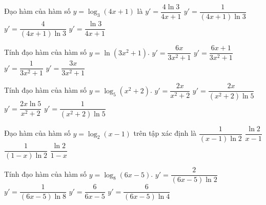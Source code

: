 \begin{ex}%
	Đạo hàm của hàm số $y=\log_3\left(4x+1\right)$ là
	\choice
	{$y'=\dfrac{4\ln 3}{4x+1}$}
	{$y'=\dfrac{1}{\left(4x+1\right)\ln 3}$}
	{\True $y'=\dfrac{4}{\left(4x+1\right)\ln 3}$}
	{$y'=\dfrac{\ln 3}{4x+1}$}
\end{ex}

\begin{ex}%
	Tính đạo hàm của hàm số $y=\ln\left(3x^2+1\right)$.
	\choice
	{\True $y'=\dfrac{6x}{3x^2+1}$}
	{$y'=\dfrac{6x+1}{3x^2+1}$}
	{$y'=\dfrac{1}{3x^2+1}$}
	{$y'=\dfrac{3x}{3x^2+1}$}
\end{ex}

\begin{ex}%
	Tính đạo hàm của hàm số $y=\log_5\left(x^2+2\right)$.
	\choice
	{$y'=\dfrac{2x}{x^2+2}$}
	{\True $y'=\dfrac{2x}{\left(x^2+2\right)\ln 5}$}
	{$y'=\dfrac{2x\ln 5}{x^2+2}$}
	{$y'=\dfrac{1}{\left(x^2+2\right)\ln 5}$}
\end{ex}

\begin{ex}%
	Đạo hàm của hàm số $y=\log_2\left(x-1\right)$ trên tập xác định là
	\choice
	{\True $\dfrac{1}{\left(x-1\right)\ln 2}$}
	{$\dfrac{\ln 2}{x-1}$}
	{$\dfrac{1}{\left(1-x\right)\ln 2}$}
	{$\dfrac{\ln 2}{1-x}$}
\end{ex}

\begin{ex}%
	Tính đạo hàm của hàm số $y=\log_8\left(6x-5\right)$.
	\choice
	{\True $y'=\dfrac{2}{\left(6x-5\right)\ln 2}$}
	{$y'=\dfrac{1}{\left(6x-5\right)\ln 8}$}
	{$y'=\dfrac{6}{6x-5}$}
	{$y'=\dfrac{6}{\left(6x-5\right)\ln 4}$}
\end{ex}

